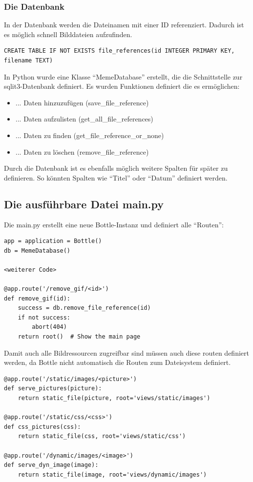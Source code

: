 \subsubsection{Die Datenbank}
In der Datenbank werden die Dateinamen mit einer ID referenziert. Dadurch ist es möglich schnell Bilddateien aufzufinden. 

\begin{lstlisting}[caption=Datenstruktur in SQL]
CREATE TABLE IF NOT EXISTS file_references(id INTEGER PRIMARY KEY, filename TEXT)
\end{lstlisting}

In Python wurde eine Klasse ``MemeDatabase'' erstellt, die die Schnittstelle zur sqlit3-Datenbank definiert. Es wurden Funktionen definiert die es ermöglichen:
\begin{itemize}
	\item ... Daten hinzuzufügen (save\_file\_reference)
	\item ... Daten aufzulisten (get\_all\_file\_references)
	\item ... Daten zu finden (get\_file\_reference\_or\_none)
	\item ... Daten zu löschen (remove\_file\_reference)
\end{itemize}

Durch die Datenbank ist es ebenfalls möglich weitere Spalten für später zu definieren. So könnten Spalten wie ``Titel'' oder ``Datum'' definiert werden. 

\subsection{Die ausführbare Datei main.py}
Die main.py erstellt eine neue Bottle-Instanz und definiert alle ``Routen'':
\begin{lstlisting}[caption=Applikationinstanz und Beispiel für Routen]
app = application = Bottle()
db = MemeDatabase()

<weiterer Code>

@app.route('/remove_gif/<id>')
def remove_gif(id):
	success = db.remove_file_reference(id)
	if not success:
		abort(404)
	return root()  # Show the main page
\end{lstlisting}

Damit auch alle Bildressourcen zugreifbar sind müssen auch diese routen definiert werden, da Bottle nicht automatisch die Routen zum Dateisystem definiert.
\begin{lstlisting}[caption=Routen zur Bildressourcen]
@app.route('/static/images/<picture>')
def serve_pictures(picture):
    return static_file(picture, root='views/static/images')
    
@app.route('/static/css/<css>')
def css_pictures(css):
    return static_file(css, root='views/static/css')
    
@app.route('/dynamic/images/<image>')
def serve_dyn_image(image):
    return static_file(image, root='views/dynamic/images')
\end{lstlisting}

